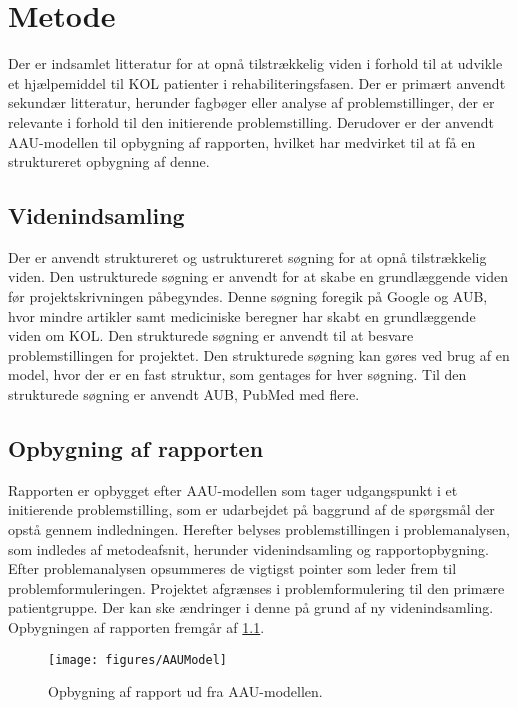 \chapter{Metode}
Der er indsamlet litteratur for at opnå tilstrækkelig viden i forhold til at udvikle et hjælpemiddel til KOL patienter i rehabiliteringsfasen. Der er primært anvendt sekundær litteratur, herunder fagbøger eller analyse af problemstillinger, der er relevante i forhold til den initierende problemstilling. Derudover er der anvendt AAU-modellen til opbygning af rapporten, hvilket har medvirket til at få en struktureret opbygning af denne. 

\section{Videnindsamling}
Der er anvendt struktureret og ustruktureret søgning for at opnå tilstrækkelig viden. Den ustrukturede søgning er anvendt for at skabe en grundlæggende viden før projektskrivningen påbegyndes. Denne søgning foregik på Google og AUB, hvor mindre artikler samt mediciniske beregner har skabt en grundlæggende viden om KOL. Den strukturede søgning er anvendt til at besvare problemstillingen for projektet. Den strukturede søgning kan gøres ved brug af en model, hvor der er en fast struktur, som gentages for hver søgning. Til den strukturede søgning er anvendt AUB, PubMed med flere. 

\section{Opbygning af rapporten}
Rapporten er opbygget efter AAU-modellen som tager udgangspunkt i et initierende problemstilling, som er udarbejdet på baggrund af de spørgsmål der opstå gennem indledningen. Herefter belyses problemstillingen i problemanalysen, som indledes af metodeafsnit, herunder videnindsamling og rapportopbygning. Efter problemanalysen opsummeres de vigtigst pointer som leder frem til problemformuleringen. Projektet afgrænses i problemformulering til den primære patientgruppe. Der kan ske ændringer i denne på grund af ny videnindsamling. Opbygningen af rapporten fremgår af \ref{fig:AAUModel}.

\begin{figure} [H]
\centering
\texttt{[image: figures/AAUModel]}
\caption{Opbygning af rapport ud fra AAU-modellen.}
\label{fig:AAUModel}
\end{figure} 